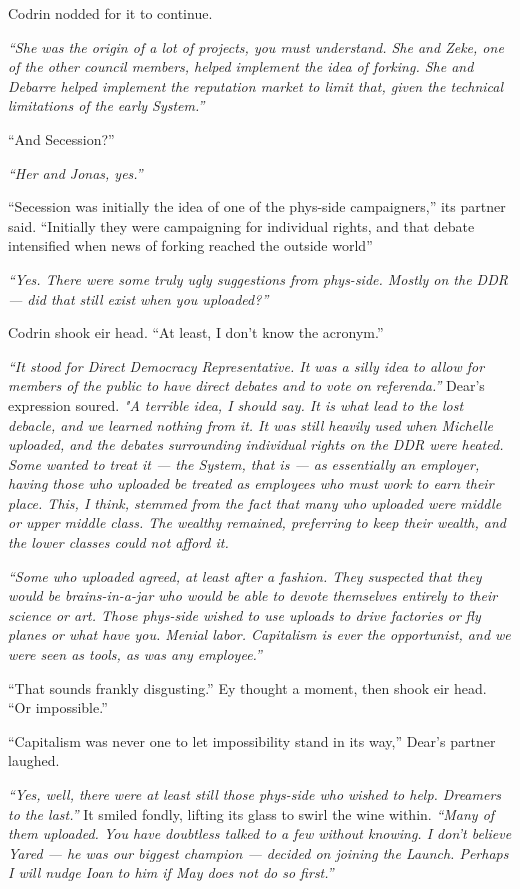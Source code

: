 Codrin nodded for it to continue.

\emph{``She was the origin of a lot of projects, you must understand. She and Zeke, one of the other council members, helped implement the idea of forking. She and Debarre helped implement the reputation market to limit that, given the technical limitations of the early System.''}

``And Secession?''

\emph{``Her and Jonas, yes.''}

``Secession was initially the idea of one of the phys-side campaigners,'' its partner said. ``Initially they were campaigning for individual rights, and that debate intensified when news of forking reached the outside world''

\emph{``Yes. There were some truly ugly suggestions from phys-side. Mostly on the DDR — did that still exist when you uploaded?''}

Codrin shook eir head. ``At least, I don't know the acronym.''

\emph{``It stood for Direct Democracy Representative. It was a silly idea to allow for members of the public to have direct debates and to vote on referenda.''} Dear's expression soured. \emph{"A terrible idea, I should say. It is what lead to the lost debacle, and we learned nothing from it. It was still heavily used when Michelle uploaded, and the debates surrounding individual rights on the DDR were heated. Some wanted to treat it — the System, that is — as essentially an employer, having those who uploaded be treated as employees who must work to earn their place. This, I think, stemmed from the fact that many who uploaded were middle or upper middle class. The wealthy remained, preferring to keep their wealth, and the lower classes could not afford it.}

\emph{``Some who uploaded agreed, at least after a fashion. They suspected that they would be brains-in-a-jar who would be able to devote themselves entirely to their science or art. Those phys-side wished to use uploads to drive factories or fly planes or what have you. Menial labor. Capitalism is ever the opportunist, and we were seen as tools, as was any employee.''}

``That sounds frankly disgusting.'' Ey thought a moment, then shook eir head. ``Or impossible.''

``Capitalism was never one to let impossibility stand in its way,'' Dear's partner laughed.

\emph{``Yes, well, there were at least still those phys-side who wished to help. Dreamers to the last.''} It smiled fondly, lifting its glass to swirl the wine within. \emph{``Many of them uploaded. You have doubtless talked to a few without knowing. I don't believe Yared — he was our biggest champion — decided on joining the Launch. Perhaps I will nudge Ioan to him if May does not do so first.''}

